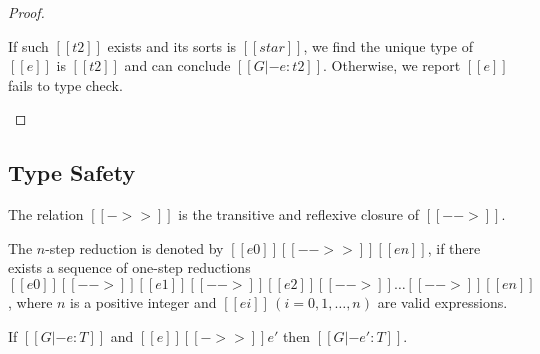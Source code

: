 \begin{proof}
\begin{description}
If such $[[t2]]$ exists and its sorts is
$[[star]]$, we find the unique type of $[[e]]$ is $[[t2]]$ and can conclude $[[G |- e:t2]]$. Otherwise, we
report $[[e]]$ fails to type check.
	\end{description}
\end{proof}

\subsection{Type Safety}
\begin{definition}
    The relation $[[->>]]$ is the transitive and reflexive closure of
$[[-->]]$.
\end{definition}

\begin{definition}
    The $n$-step reduction is denoted by $[[e0]] [[-->>]] [[en]]$, if
    there exists a sequence of one-step reductions $[[e0]] [[-->]]
    [[e1]] [[-->]] [[e2]] [[-->]] \dots [[-->]] [[en]]$, where $n$ is
    a positive integer and $[[ei]]\,(i=0,1,\dots,n)$ are valid
    expressions.
\end{definition}

\begin{theorem}
If $[[G |- e:T]]$ and $[[e]] [[->>]] e'$ then $[[G |- e':T]]$.
\end{theorem}

